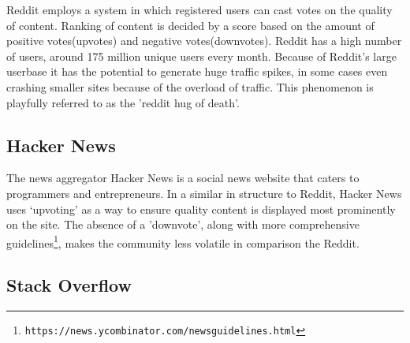 \documentclass[a4paper,11pt]{article} %
\begin{document}
Reddit employs a system in which registered users can cast votes on the
quality of content. Ranking of content is decided by a score based on the
amount of positive votes(upvotes) and negative votes(downvotes). Reddit has
a high number of users, around 175 million unique users every month. Because
of Reddit's large userbase it has the potential to generate huge traffic
spikes, in some cases even crashing smaller sites because of the overload of
traffic. This phenomenon is playfully referred to as the 'reddit hug of
death’.


\subsection{Hacker News}
The news aggregator Hacker News is a social news website that caters to
programmers and entrepreneurs. In a similar in structure to Reddit, Hacker
News uses ‘upvoting’ as a way to ensure quality content is displayed most
prominently on the site. The absence of a 'downvote', along with more
comprehensive
guidelines\footnote{\texttt{https://news.ycombinator.com/newsguidelines.html}},
makes the community less volatile in comparison the Reddit.


\subsection{Stack Overflow}
\end{document}
